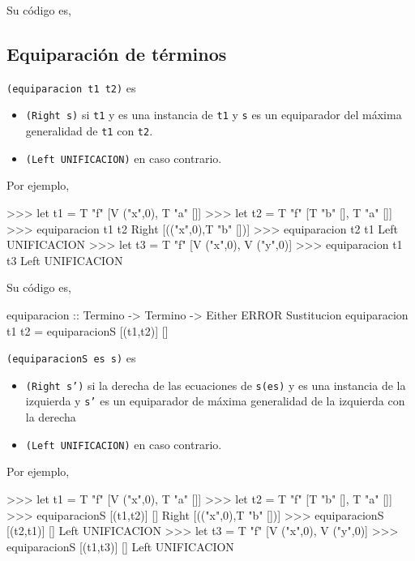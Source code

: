 Su código es,
 

\subsection{Equiparación de términos}

 \texttt{(equiparacion t1 t2)} es
\begin{itemize}
\item \texttt{(Right s)} si \texttt{t1} y es una instancia de \texttt{t1} y \texttt{s} es un equiparador
  del máxima generalidad de \texttt{t1} con \texttt{t2}.
\item \texttt{(Left UNIFICACION)} en caso contrario.
\end{itemize}
Por ejemplo,
\begin{sesion}
>>> let t1 = T "f" [V ("x",0), T "a" []]
>>> let t2 = T "f" [T "b" [],  T "a" []]
>>> equiparacion t1 t2
Right [(("x",0),T "b" [])]
>>> equiparacion t2 t1
Left UNIFICACION
>>> let t3 = T "f" [V ("x",0), V ("y",0)]
>>> equiparacion t1 t3
Left UNIFICACION
\end{sesion}

Su código es,
\begin{codigo}
equiparacion :: Termino -> Termino -> Either ERROR Sustitucion
equiparacion t1 t2 = equiparacionS [(t1,t2)] []
\end{codigo}

 \texttt{(equiparacionS es s)} es
\begin{itemize}
\item \texttt{(Right s')} si la derecha de las ecuaciones de
  \texttt{s(es)} y es una instancia de la izquierda y \texttt{s'} es
  un equiparador de máxima generalidad de la izquierda con la derecha
\item \texttt{(Left UNIFICACION)} en caso contrario.
\end{itemize}
Por ejemplo,
\begin{sesion}
>>> let t1 = T "f" [V ("x",0), T "a" []]
>>> let t2 = T "f" [T "b" [],  T "a" []]
>>> equiparacionS [(t1,t2)] []
Right [(("x",0),T "b" [])]
>>> equiparacionS [(t2,t1)] []
Left UNIFICACION
>>> let t3 = T "f" [V ("x",0), V ("y",0)]
>>> equiparacionS [(t1,t3)] []
Left UNIFICACION
\end{sesion}

